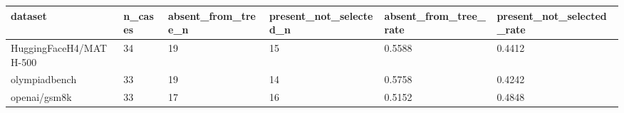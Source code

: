 \begin{tabular}{llllll}
\hline
dataset & n\_cases & absent\_from\_tree\_n & present\_not\_selected\_n & absent\_from\_tree\_rate & present\_not\_selected\_rate \\
\hline
HuggingFaceH4/MATH-500 & 34 & 19 & 15 & 0.5588 & 0.4412 \\
olympiadbench & 33 & 19 & 14 & 0.5758 & 0.4242 \\
openai/gsm8k & 33 & 17 & 16 & 0.5152 & 0.4848 \\
\hline
\end{tabular}
